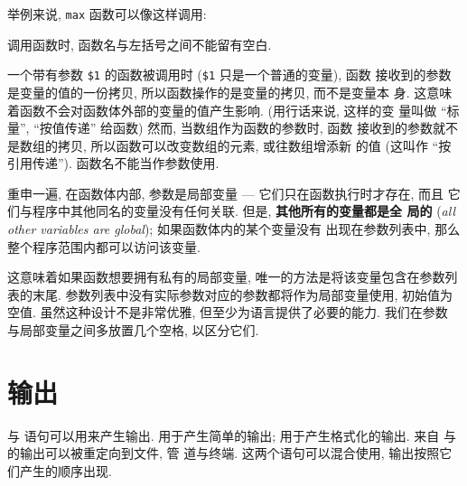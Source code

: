 举例来说, \verb'max' 函数可以像这样调用:
调用函数时, 函数名与左括号之间不能留有空白.

一个带有参数 \verb'$1' 的函数被调用时 (\verb'$1' 只是一个普通的变量), 函数 
接收到的参数是变量的值的一份拷贝, 所以函数操作的是变量的拷贝, 而不是变量本
身. 这意味着函数不会对函数体外部的变量的值产生影响. (用行话来说, 这样的变
量叫做 ``标量'', ``按值传递'' 给函数) 然而, 当数组作为函数的参数时, 函数 
接收到的参数就不是数组的拷贝, 所以函数可以改变数组的元素, 或往数组增添新
的值 (这叫作 ``按引用传递''). 函数名不能当作参数使用.

重申一遍, 在函数体内部, 参数是局部变量 --- 它们只在函数执行时才存在, 而且 
它们与程序中其他同名的变量没有任何关联. 但是, \textbf{其他所有的变量都是全
局的} (\emph{all other variables are global}); 如果函数体内的某个变量没有
出现在参数列表中, 那么整个程序范围内都可以访问该变量.

这意味着如果函数想要拥有私有的局部变量, 唯一的方法是将该变量包含在参数列
表的末尾. 参数列表中没有实际参数对应的参数都将作为局部变量使用, 初始值为
空值. 虽然这种设计不是非常优雅, 但至少为语言提供了必要的能力. 我们在参数
与局部变量之间多放置几个空格, 以区分它们.

\section{输出}
\label{sec:output}

\print 与 \printf 语句可以用来产生输出. \print 用于产生简单的输出; \printf 
用于产生格式化的输出. 来自 \print 与 \printf 的输出可以被重定向到文件, 管
道与终端. 这两个语句可以混合使用, 输出按照它们产生的顺序出现.


